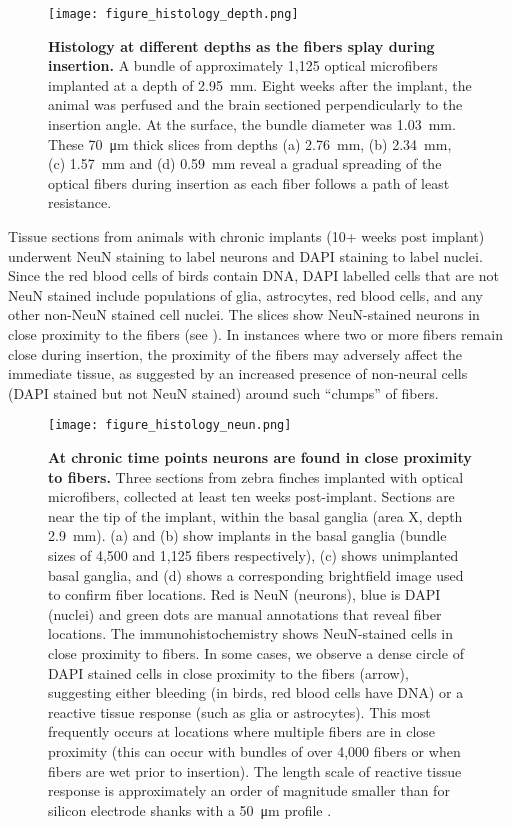 \begin{figure}
\texttt{[image: figure\_histology\_depth.png]}
\caption[Histology showing microfibers at different 
implant depths.]{\textbf{Histology at different depths as the 
fibers splay during insertion.} A bundle of approximately 
1,125 optical microfibers implanted at a depth of 2.95~mm. 
Eight weeks after the implant, the animal was perfused 
and the brain sectioned perpendicularly to 
the insertion angle. At the surface, the bundle diameter 
was 1.03~mm. These 70~\si{\micro\meter} thick slices from depths 
(a) 2.76~mm, (b) 2.34~mm, (c) 1.57~mm and (d) 0.59~mm 
reveal a gradual spreading of the optical fibers during insertion as each fiber 
follows a path of least resistance.}
\label{fig:histology_depth}
\end{figure}

Tissue sections from animals with chronic implants 
(10+ weeks post implant) underwent NeuN staining to label 
neurons and DAPI staining to label nuclei. Since the red blood 
cells of birds contain DNA, DAPI labelled cells that are not 
NeuN stained include populations of glia, astrocytes, red blood 
cells, and any other non-NeuN stained cell nuclei. The slices 
show NeuN-stained neurons in close proximity to the fibers (see 
). In instances where two or more fibers remain close 
during insertion, the proximity of the fibers may adversely 
affect the immediate tissue, as suggested by an increased 
presence of non-neural cells (DAPI stained but not NeuN stained) 
around such ``clumps'' of fibers.

\begin{figure}
\centering
\texttt{[image: figure\_histology\_neun.png]}
\caption[NeuN and DAPI staining of tissue at fiber 
implant tips.]{\textbf{At chronic time points neurons are found in 
close proximity to fibers.} Three sections from zebra finches implanted with 
optical microfibers, collected at least ten weeks post-implant. 
Sections are near the tip of the implant, within the basal ganglia 
(area X, depth 2.9~mm). (a) and (b) show implants in the basal 
ganglia (bundle sizes of 4,500 and 1,125 fibers respectively), 
(c) shows unimplanted basal ganglia, and (d) shows a 
corresponding brightfield image used to confirm fiber locations. 
Red is NeuN (neurons), blue 
is DAPI (nuclei) and green dots are manual annotations that 
reveal fiber locations. 
The immunohistochemistry shows NeuN-stained cells in close 
proximity to fibers. In some cases, we observe a dense 
circle of DAPI stained cells in close proximity to the 
fibers (arrow), suggesting either bleeding (in birds, red 
blood cells have DNA) or a reactive tissue response (such as glia 
or astrocytes). This most frequently occurs at locations 
where multiple fibers are in close proximity (this can 
occur with bundles of over 4,000 fibers or when fibers are 
wet prior to insertion). The length scale of reactive 
tissue response is approximately an order of magnitude 
smaller than for silicon electrode shanks with a 50~\si{\micro\meter} 
profile \cite{Szarowski:2003cz}.}
\label{fig:histology_neun}
\end{figure}

